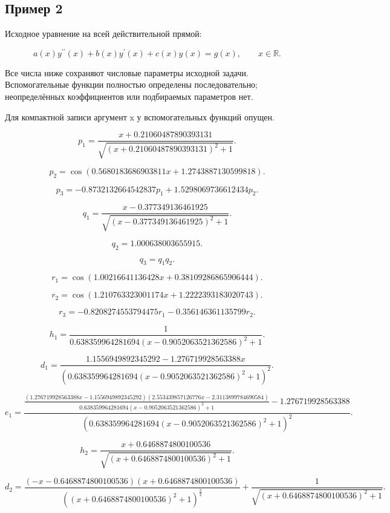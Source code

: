 \subsection*{Пример 2}

Исходное уравнение на всей действительной прямой:

\[a(x)y^{\prime\prime}(x)+b(x)y^\prime(x)+c(x)y(x)=g(x),\qquad x\in\mathbb R.\]

Все числа ниже сохраняют числовые параметры исходной задачи. Вспомогательные функции полностью определены последовательно; неопределённых коэффициентов или подбираемых параметров нет.

Для компактной записи аргумент x у вспомогательных функций опущен.

\[p_{1}=\frac{x + 0.21060487890393131}{\sqrt{\left(x + 0.21060487890393131\right)^{2} + 1}}.\]

\[p_{2}=\cos{\left(0.5680183686903811 x + 1.2743887130599818 \right)}.\]

\[p_{3}=- 0.8732132664542837 p_{1} + 1.5298069736612434 p_{2}.\]

\[q_{1}=\frac{x - 0.377349136461925}{\sqrt{\left(x - 0.377349136461925\right)^{2} + 1}}.\]

\[q_{2}=1.000638003655915.\]

\[q_{3}=q_{1} q_{2}.\]

\[r_{1}=\cos{\left(1.00216641136428 x + 0.38109286865906444 \right)}.\]

\[r_{2}=\cos{\left(1.210763323001174 x + 1.2222393183020743 \right)}.\]

\[r_{3}=- 0.8208274553794475 r_{1} - 0.356146361135799 r_{2}.\]

\[h_{1}=\frac{1}{0.638359964281694 \left(x - 0.9052063521362586\right)^{2} + 1}.\]

\[d_{1}=\frac{1.1556949892345292 - 1.276719928563388 x}{\left(0.638359964281694 \left(x - 0.9052063521362586\right)^{2} + 1\right)^{2}}.\]

\[e_{1}=\frac{\frac{\left(1.276719928563388 x - 1.1556949892345292\right) \left(2.553439857126776 x - 2.3113899784690584\right)}{0.638359964281694 \left(x - 0.9052063521362586\right)^{2} + 1} - 1.276719928563388}{\left(0.638359964281694 \left(x - 0.9052063521362586\right)^{2} + 1\right)^{2}}.\]

\[h_{2}=\frac{x + 0.6468874800100536}{\sqrt{\left(x + 0.6468874800100536\right)^{2} + 1}}.\]

\[d_{2}=\frac{\left(- x - 0.6468874800100536\right) \left(x + 0.6468874800100536\right)}{\left(\left(x + 0.6468874800100536\right)^{2} + 1\right)^{\frac{3}{2}}} + \frac{1}{\sqrt{\left(x + 0.6468874800100536\right)^{2} + 1}}.\]

